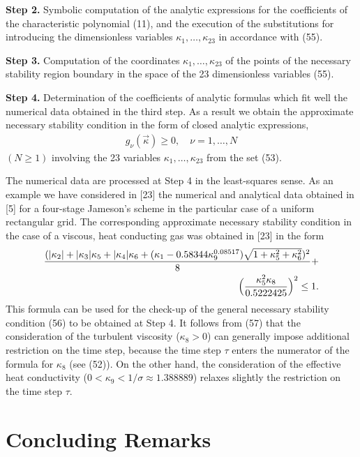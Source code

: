   {\bf Step 2.} Symbolic computation of the analytic expressions for
the coefficients of the characteristic polynomial (11), and the execution of
the substitutions for introducing the dimensionless variables
$\kappa_1,\ldots,\kappa_{23}$ in accordance with (55).

  {\bf Step 3.} Computation of the coordinates $\kappa_1,\ldots,\kappa_{23}$ of
the points of the necessary stability region
boundary in the space of the 23 dimensionless variables (55).

 {\bf Step 4.} Determination of the coefficients of analytic formulas
which fit well the numerical data obtained in the third step. As a result we
obtain the approximate necessary stability condition in the form of closed
analytic expressions,
\begin{eqnarray}
g_{\nu}(\vec{\kappa})\geq 0,\quad \nu = 1,\ldots,N
\end{eqnarray}
$(N\geq 1)$ involving the 23 variables $\kappa_1,\ldots,\kappa_{23}$ from the
set (53).

   The numerical data are processed at Step 4 in the least-squares sense. As an
example we have considered in [23] the numerical and analytical data obtained
in [5] for a four-stage Jameson's scheme in the particular case of a uniform
rectangular grid. The corresponding approximate necessary stability condition
in the case of a viscous, heat conducting gas was obtained in [23] in the form
\begin{eqnarray}
\frac{(|\kappa_2| + |\kappa_3|\kappa_5 + |\kappa_4|\kappa_6 + (\kappa_1
-0.58344 \kappa_9^{0.08517})
\sqrt{1+\kappa_5^2 +\kappa_6^2})^2}{8} +\nonumber\\
\Bigl(\frac{\kappa_5^2\kappa_8}{0.5222425}\Bigr)^2 \leq 1.
\end{eqnarray}
This formula can be used for the check-up of the general necessary stability
condition (56) to be obtained at Step 4. It follows from (57) that the
consideration of the turbulent viscosity ($\kappa_8>0$) can generally impose
additional restriction on the time step, because the time step $\tau$ enters
the numerator of the formula for $\kappa_8$ (see (52)). On the other hand, the
consideration of the effective heat conductivity ($0<\kappa_9<1/\sigma\approx
1.388889$) relaxes slightly the restriction on the time step $\tau$.

\section{Concluding Remarks}
\hspace{6mm}

